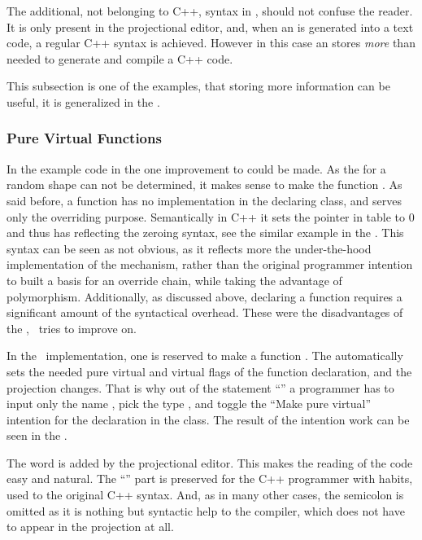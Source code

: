 
The additional, not belonging to C++, syntax in \pcpp, should not confuse the reader. It is only 
present in the projectional editor, and, when an  is generated into a text code, a regular
C++ syntax is achieved. However in this case an  stores \emph{more} than needed to 
generate and compile a C++ code. 

This subsection is one of the examples, that storing more information can be useful,
it is generalized in the .


\subsubsection{Pure Virtual Functions}
\label{purevirtualfuncs}

In the example code in the  one improvement to could be made. As the  for a random shape can not 
be determined, it makes sense to make the  function . As said before, a  
function has no implementation in the declaring class, and serves only the overriding purpose. Semantically in C++ it sets the 
pointer in  table to 0 and thus has reflecting the zeroing syntax, see the similar example in the .
This syntax can be seen as not obvious, as it reflects more the under-the-hood implementation of the mechanism,
rather than the original programmer intention to built a basis for an override chain, while taking the advantage of 
polymorphism.
Additionally, as discussed above, declaring a  function requires a significant amount of the syntactical
overhead. 
These were the disadvantages of the \cpppl, \pcpp\ tries to improve on.

In the \pcpp\ implementation, one  is reserved to make a function . The  automatically
sets the needed pure virtual and virtual flags of the function declaration, and the projection changes. That is why out of the 
statement ``'' a programmer has to input only the name , pick the type , and
toggle the ``Make pure virtual'' intention for the declaration in the  class.
The result of the intention work can be seen in the .


The word  is added by the projectional editor. This makes the reading of the code easy and natural.
The ``'' part is preserved for the C++ programmer with habits, used to the original C++ syntax. And, as in many other cases, 
the semicolon is omitted as it is nothing but syntactic help to the compiler, which does not have to appear 
in the projection at all.

